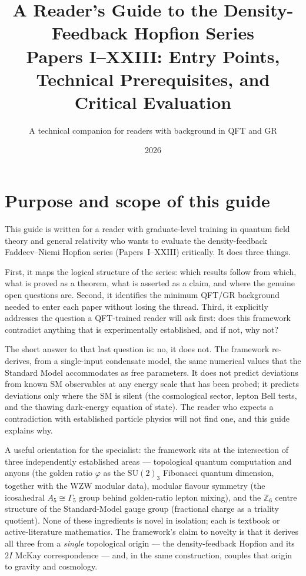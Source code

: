 \documentclass[11pt,a4paper]{article}
\title{\textbf{A Reader's Guide to the Density-Feedback Hopfion Series\\[4pt]
\large Papers I--XXIII: Entry Points, Technical Prerequisites, and Critical Evaluation}}
\author{A technical companion for readers with background in QFT and GR}
\date{2026}
\newcommand{\vp}{\varphi}
\newcommand{\ZZ}{\mathbb{Z}}
\newcommand{\twoI}{2I}
\begin{document}
\maketitle
\tableofcontents
\newpage

\section{Purpose and scope of this guide}

This guide is written for a reader with graduate-level training in quantum field
theory and general relativity who wants to evaluate the density-feedback
Faddeev--Niemi Hopfion series (Papers~I--XXIII) critically. It does three things.

First, it maps the logical structure of the series: which results follow from
which, what is proved as a theorem, what is asserted as a claim, and where the
genuine open questions are. Second, it identifies the minimum QFT/GR background
needed to enter each paper without losing the thread. Third, it explicitly
addresses the question a QFT-trained reader will ask first: does this framework
contradict anything that is experimentally established, and if not, why not?

The short answer to that last question is: no, it does not. The framework
re-derives, from a single-input condensate model, the same numerical values that
the Standard Model accommodates as free parameters. It does not predict
deviations from known SM observables at any energy scale that has been probed;
it predicts deviations only where the SM is silent (the cosmological sector,
lepton Bell tests, and the thawing dark-energy equation of state). The reader
who expects a contradiction with established particle physics will not find
one, and this guide explains why.

A useful orientation for the specialist: the framework sits at the intersection
of three independently established areas --- topological quantum computation and
anyons (the golden ratio $\vp$ as the $\mathrm{SU}(2)_3$ Fibonacci quantum
dimension, together with the WZW modular data), modular flavour symmetry (the
icosahedral $A_5\cong\Gamma_5$ group behind golden-ratio lepton mixing), and the
$\ZZ_6$ centre structure of the Standard-Model gauge group (fractional charge as
a triality quotient). None of these ingredients is novel in isolation; each is
textbook or active-literature mathematics. The framework's claim to novelty is
that it derives all three from a \emph{single} topological origin --- the
density-feedback Hopfion and its $\twoI$ McKay correspondence --- and, in the
same construction, couples that origin to gravity and cosmology.
\end{document}
